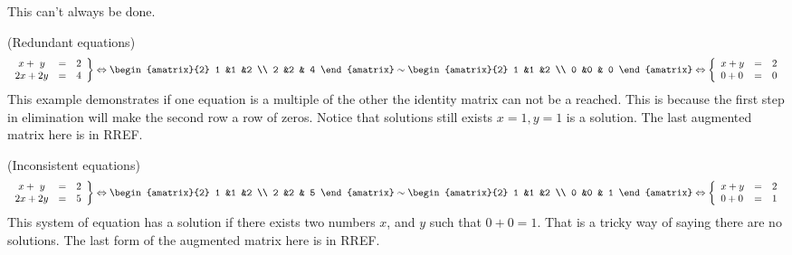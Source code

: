 \noindent
This can't always be done.

\begin{example} (Redundant equations)
 \begin{eqnarray*}
   \left.
\begin{array}{lcr}
	\ x + \ y & = & 2 \\
	2x + 2y & = &  4
     \end{array}
   \right\} 
   \Leftrightarrow
\begin{amatrix}{2}
1 &1 &2 \\ 2 &2 & 4
\end{amatrix}
\sim
\begin{amatrix}{2}
1 &1 &2 \\ 0 &0 & 0
\end{amatrix}
\Leftrightarrow
\left\{
\begin{array}{lcr}
	x + y & = & 2 \\
	 0 + 0 & = &  0
     \end{array}
   \right.
\end{eqnarray*}  
This example demonstrates if one equation is a multiple of the other the identity matrix can not be a reached. This is because the first step in elimination will make the second row a row of zeros. Notice that solutions still exists $x=1,y=1$ is a solution. The last augmented matrix here is in RREF.
\end{example}

\begin{example} (Inconsistent equations)
 \begin{eqnarray*}
   \left.
\begin{array}{lcr}
	\ x + \ y & = & 2 \\
	2x + 2y & = &  5
     \end{array}
   \right\} 
   \Leftrightarrow
\begin{amatrix}{2}
1 &1 &2 \\ 2 &2 & 5
\end{amatrix}
\sim
\begin{amatrix}{2}
1 &1 &2 \\ 0 &0 & 1
\end{amatrix}
\Leftrightarrow
\left\{
\begin{array}{lcr}
	x + y & = & 2 \\
	 0 + 0 & = &  1
     \end{array}
   \right.
\end{eqnarray*}  
This system of equation has a solution if there exists two numbers $x$, and $y$ such that $0+0=1$. That is a tricky way of saying there are no solutions. The last form of the augmented matrix here is in RREF.
\end{example}


